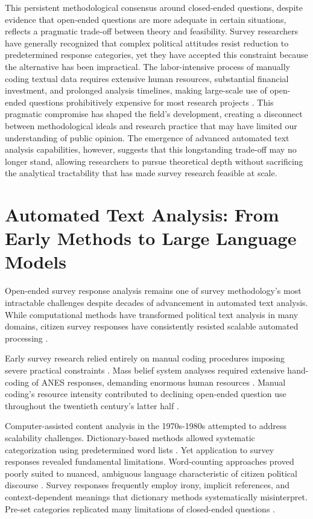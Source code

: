 \documentclass[
  journal=ram,
  manuscript=article-type,
  year=2025,
  volume=unpublished,
]{cup-journal}
\begin{document}
This persistent methodological consensus around closed-ended questions, despite evidence that open-ended questions are more adequate in certain situations, reflects a pragmatic trade-off between theory and feasibility.
Survey researchers have generally recognized that complex political attitudes resist reduction to predetermined response categories, yet they have accepted this constraint because the alternative has been impractical.
The labor-intensive process of manually coding textual data requires extensive human resources, substantial financial investment, and prolonged analysis timelines, making large-scale use of open-ended questions prohibitively expensive for most research projects \citep{lazarsfeld44, geer91, roberts_etal14}.
This pragmatic compromise has shaped the field's development, creating a disconnect between methodological ideals and research practice that may have limited our understanding of public opinion.
The emergence of advanced automated text analysis capabilities, however, suggests that this longstanding trade-off may no longer stand, allowing researchers to pursue theoretical depth without sacrificing the analytical tractability that has made survey research feasible at scale.

\section{Automated Text Analysis: From Early Methods to Large Language Models}

Open-ended survey response analysis remains one of survey methodology's most intractable challenges despite decades of advancement in automated text analysis.
While computational methods have transformed political text analysis in many domains, citizen survey responses have consistently resisted scalable automated processing \citep{roberts_etal14}.

Early survey research relied entirely on manual coding procedures imposing severe practical constraints \citep{lasswell27, berelson52, holsti69, weber90, krippendorff19}.
Mass belief system analyses required extensive hand-coding of ANES responses, demanding enormous human resources \citep{converse64}.
Manual coding's resource intensity contributed to declining open-ended question use throughout the twentieth century's latter half \citep{converse84, hickey_kipping96, galura_etal22}.

Computer-assisted content analysis in the 1970s-1980s attempted to address scalability challenges.
Dictionary-based methods allowed systematic categorization using predetermined word lists \citep{pennebaker_etal01, tausczik_pennebaker10, young_soroka12, laver_garry00}.
Yet application to survey responses revealed fundamental limitations.
Word-counting approaches proved poorly suited to nuanced, ambiguous language characteristic of citizen political discourse \citep{tausczik_pennebaker10}.
Survey responses frequently employ irony, implicit references, and context-dependent meanings that dictionary methods systematically misinterpret.
Pre-set categories replicated many limitations of closed-ended questions \citep{mossholder_etal95, rohrer_etal17}.
\end{document}
